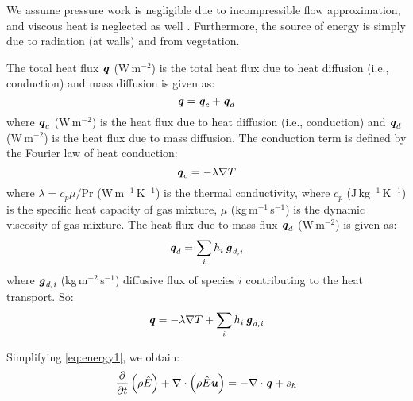 \begin{assumption}
We assume pressure work is negligible due to incompressible flow approximation, and viscous heat is neglected as well \citep{Defraeye2011}. Furthermore, the source of energy is simply due to radiation (at walls) and from vegetation. 
\end{assumption}

The total heat flux $\textbf{\textit{q}}$ (W\,m$^{-2}$) is the total heat flux due to heat diffusion (i.e., conduction) and mass diffusion is given as:
\begin{equation}
\textbf{\textit{q}} = \textbf{\textit{q}}_c + \textbf{\textit{q}}_d
\label{eq:totalheatflux}
\end{equation}
where $\textbf{\textit{q}}_c$ (W\,m$^{-2}$) is the heat flux due to heat diffusion (i.e., conduction) and $\textbf{\textit{q}}_d$ (W\,m$^{-2}$) is the heat flux due to mass diffusion. The conduction term is defined by the Fourier law of heat conduction:
\begin{equation}
\textbf{\textit{q}}_c = - \lambda \nabla T
\end{equation}
where $\lambda = c_p\mu/\mathrm{Pr}$ (W\,m$^{-1}$\,K$^{-1}$) is the thermal conductivity, where $c_p$ (J\,kg$^{-1}$\,K$^{-1}$) is the specific heat capacity of gas mixture, $\mu$ (kg\,m$^{-1}$\,s$^{-1}$) is the dynamic viscosity of gas mixture. The heat flux due to mass flux $\textbf{\textit{q}}_d$ (W\,m$^{-2}$) is given as:
\begin{equation}
\textbf{\textit{q}}_d = \sum_i h_i\, \textbf{\textit{g}}_{\textit{d,i}}
\end{equation}
where $\textbf{\textit{g}}_{\textit{d,i}}$ (kg\,m$^{-2}$\,s$^{-1}$) diffusive flux of species $i$ contributing to the heat transport. So:
\begin{equation}
\textbf{\textit{q}} = - \lambda \nabla T + \sum_i h_i\, \textbf{\textit{g}}_{\textit{d,i}}
\end{equation}

Simplifying \cref{eq:energy1}, we obtain:
\begin{equation}
\frac{\partial }{{\partial t}}\left( {{\rho }{\hat{E}}} \right) + \nabla  \cdot \left( {{\rho }{\hat{E}}{\textbf{\textit{u}}}} \right) =  - \nabla  \cdot {\textbf{\textit{q}}}  + s_h
\label{eq:energy1p1}
\end{equation}




